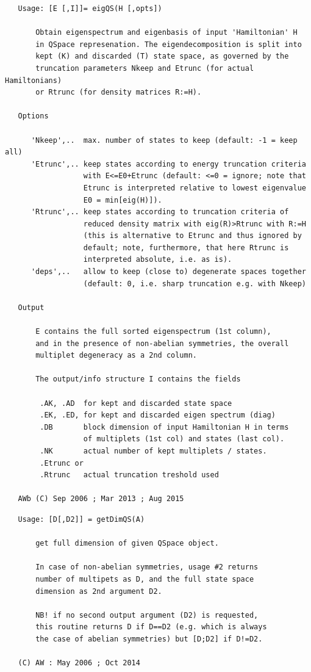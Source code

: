 \documentclass[twoside,12pt]{article}
\begin{document}
\pagebreak[3]



\begin{verbatim}
   Usage: [E [,I]]= eigQS(H [,opts])
 
       Obtain eigenspectrum and eigenbasis of input 'Hamiltonian' H
       in QSpace represenation. The eigendecomposition is split into
       kept (K) and discarded (T) state space, as governed by the
       truncation parameters Nkeep and Etrunc (for actual Hamiltonians)
       or Rtrunc (for density matrices R:=H).
 
   Options
 
      'Nkeep',..  max. number of states to keep (default: -1 = keep all)
      'Etrunc',.. keep states according to energy truncation criteria
                  with E<=E0+Etrunc (default: <=0 = ignore; note that
                  Etrunc is interpreted relative to lowest eigenvalue
                  E0 = min[eig(H)]).
      'Rtrunc',.. keep states according to truncation criteria of
                  reduced density matrix with eig(R)>Rtrunc with R:=H
                  (this is alternative to Etrunc and thus ignored by
                  default; note, furthermore, that here Rtrunc is
                  interpreted absolute, i.e. as is).
      'deps',..   allow to keep (close to) degenerate spaces together
                  (default: 0, i.e. sharp truncation e.g. with Nkeep)
 
   Output
 
       E contains the full sorted eigenspectrum (1st column),
       and in the presence of non-abelian symmetries, the overall
       multiplet degeneracy as a 2nd column.
 
       The output/info structure I contains the fields
 
        .AK, .AD  for kept and discarded state space
        .EK, .ED, for kept and discarded eigen spectrum (diag)
        .DB       block dimension of input Hamiltonian H in terms
                  of multiplets (1st col) and states (last col).
        .NK       actual number of kept multiplets / states.
        .Etrunc or
        .Rtrunc   actual truncation treshold used
 
   AWb (C) Sep 2006 ; Mar 2013 ; Aug 2015
\end{verbatim}

\pagebreak[3]



\begin{verbatim}
   Usage: [D[,D2]] = getDimQS(A)
 
       get full dimension of given QSpace object.
 
       In case of non-abelian symmetries, usage #2 returns
       number of multipets as D, and the full state space
       dimension as 2nd argument D2.
 
       NB! if no second output argument (D2) is requested,
       this routine returns D if D==D2 (e.g. which is always
       the case of abelian symmetries) but [D;D2] if D!=D2.
 
   (C) AW : May 2006 ; Oct 2014
\end{verbatim}
\end{document}
